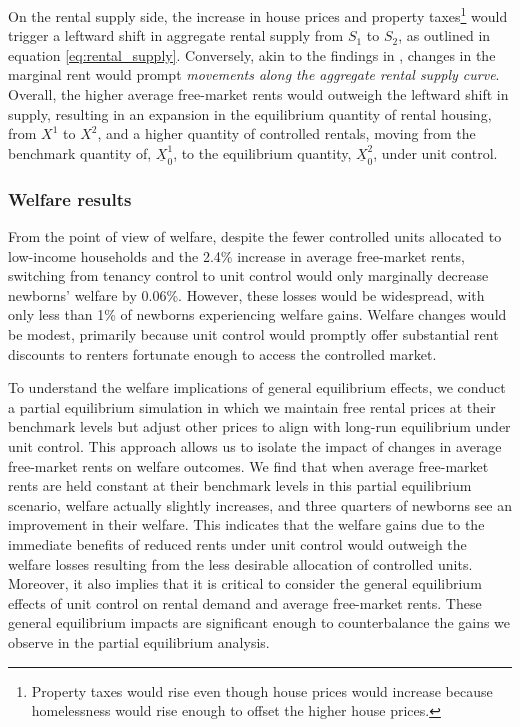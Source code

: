 \documentclass[parskip=full]{article}
\begin{document}
On the rental supply side, the increase in house prices and property taxes\footnote{Property taxes would rise even though house prices would increase because homelessness would rise enough to offset the higher house prices.} would trigger a leftward shift in aggregate rental supply from $S_{1}$ to $S_{2}$, as outlined in equation \eqref{eq:rental_supply}. Conversely, akin to the findings in \citet{fallis-1985}, changes in the marginal rent would prompt \textsl{movements along the aggregate rental supply curve}. Overall, the higher average free-market rents would outweigh the leftward shift in supply, resulting in an expansion in the equilibrium quantity of rental housing, from $X^{1}$ to $X^{2}$, and a higher quantity of controlled rentals, moving from the benchmark quantity of, $\underline{X}^{1}_{0}$, to the equilibrium quantity, $\underline{X}^{2}_{0}$, under unit control. 

\subsubsection{Welfare results}

From the point of view of welfare, despite the fewer controlled units allocated to low-income households and the 2.4\% increase in average free-market rents, switching from tenancy control to unit control would only marginally decrease newborns' welfare by 0.06\%. However, these losses would be widespread, with only less than 1\% of newborns experiencing welfare gains. Welfare changes would be modest, primarily because unit control would promptly offer substantial rent discounts to renters fortunate enough to access the controlled market.

To understand the welfare implications of general equilibrium effects, we conduct a partial equilibrium simulation in which we maintain free rental prices at their benchmark levels but adjust other prices to align with long-run equilibrium under unit control. This approach allows us to isolate the impact of changes in average free-market rents on welfare outcomes. We find that when average free-market rents are held constant at their benchmark levels in this partial equilibrium scenario, welfare actually slightly increases, and three quarters of newborns see an improvement in their welfare. This indicates that the welfare gains due to the immediate benefits of reduced rents under unit control would outweigh the welfare losses resulting from the less desirable allocation of controlled units. Moreover, it also implies that it is critical to consider the general equilibrium effects of unit control on rental demand and average free-market rents. These general equilibrium impacts are significant enough to counterbalance the gains we observe in the partial equilibrium analysis.
\end{document}
